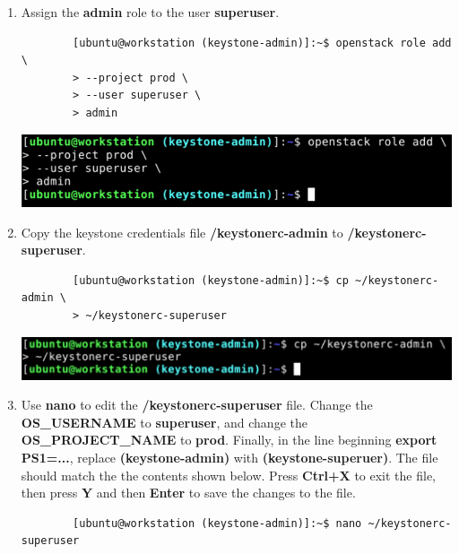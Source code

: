 \documentclass[letterpaper, 12pt]{article}
\begin{document}
\begin{enumerate}
    \item Assign the \textbf{admin} role to the user \textbf{superuser}.
    \begin{lstlisting}
        [ubuntu@workstation (keystone-admin)]:~$ openstack role add \
        > --project prod \
        > --user superuser \
        > admin
    \end{lstlisting}

    \begin{center}
        \includegraphics[width=\linewidth]{images/part1/step6.png}
    \end{center}

    \item Copy the keystone credentials file \textbf{\texttildemid/keystonerc-admin} to
    \textbf{\texttildemid/keystonerc-superuser}.
    \begin{lstlisting}
        [ubuntu@workstation (keystone-admin)]:~$ cp ~/keystonerc-admin \
        > ~/keystonerc-superuser
    \end{lstlisting}

    \begin{center}
        \includegraphics[width=\linewidth]{images/part1/step7.png}
    \end{center}

    \item Use \textbf{nano} to edit the \textbf{\texttildemid/keystonerc-superuser} file. Change the
    \textbf{OS\_USERNAME} to \textbf{superuser}, and change the \textbf{OS\_PROJECT\_NAME} to \textbf{prod}. Finally,
    in the line beginning \textbf{export PS1=...}, replace \textbf{(keystone-admin)} with \textbf{(keystone-superuer)}.
    The file should match the the contents shown below. Press \textbf{Ctrl+X} to exit the file, then press \textbf{Y}
    and then \textbf{Enter} to save the changes to the file.
    \begin{lstlisting}
        [ubuntu@workstation (keystone-admin)]:~$ nano ~/keystonerc-superuser
    \end{lstlisting}    


\end{enumerate}
\end{document}
